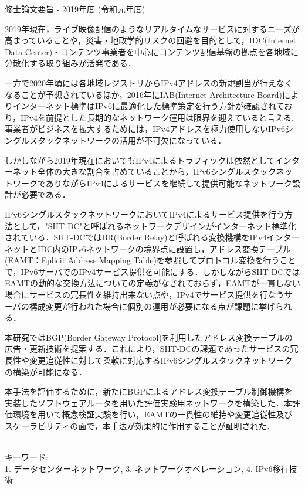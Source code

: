 修士論文要旨 - 2019年度 (令和元年度)
\begin{center}
\begin{large}
\end{large}
\end{center}

2019年現在，ライブ映像配信のようなリアルタイムなサービスに対するニーズが高まっていることや，災害・地政学的リスクの回避を目的として，IDC(Internet Data Center)・コンテンツ事業者を中心にコンテンツ配信基盤の拠点を各地域に分散化する取り組みが活発である．

一方で2020年頃には各地域レジストリからIPv4アドレスの新規割当が行えなくなることが予想されているほか，2016年にIAB(Internet Architecture Board)によりインターネット標準はIPv6に最適化した標準策定を行う方針が確認されており，IPv4を前提とした長期的なネットワーク運用は限界を迎えていると言える.事業者がビジネスを拡大するためには，IPv4アドレスを極力使用しないIPv6シングルスタックネットワークの活用が不可欠になっている．

しかしながら2019年現在においてもIPv4によるトラフィックは依然としてインターネット全体の大きな割合を占めていることから，IPv6シングルスタックネットワークでありながらIPv4によるサービスを継続して提供可能なネットワーク設計が必要である．

IPv6シングルスタックネットワークにおいてIPv4によるサービス提供を行う方法として，"SIIT-DC"と呼ばれるネットワークデザインがインターネット標準化されている．SIIT-DCではBR(Border Relay)と呼ばれる変換機構をIPv4インターネットとIDC内のIPv6ネットワークの境界点に設置し，アドレス変換テーブル(EAMT：Eplicit Address Mapping Table)を参照してプロトコル変換を行うことで，IPv6サーバでのIPv4サービス提供を可能にする．しかしながらSIIT-DCではEAMTの動的な交換方法についての定義がなされておらず，EAMTが一貫しない場合にサービスの冗長性を維持出来ない点や，IPv4でサービス提供を行なうサーバの構成変更が行われた場合に個別の運用が必要になる点が課題に挙げられる．

本研究ではBGP(Border Gateway Protocol)を利用したアドレス変換テーブルの広告・更新技術を提案する．これにより，SIIT-DCの課題であったサービスの冗長性や変更追従性に対して柔軟に対応するIPv6シングルスタックネットワークの構築が可能になる．

本手法を評価するために，新たにBGPによるアドレス変換テーブル制御機構を実装したソフトウェアルータを用いた評価実験用ネットワークを構築した．本評価環境を用いて概念検証実験を行い，EAMTの一貫性の維持や変更追従性及びスケーラビリティの面で，本手法が効果的に作用することが証明された．

~ \\

キーワード:\\
\underline{1. データセンターネットワーク},
\underline{3. ネットワークオペレーション},
\underline{4. IPv6移行技術}
\begin{flushright}
\dept \\
\author
\end{flushright}
